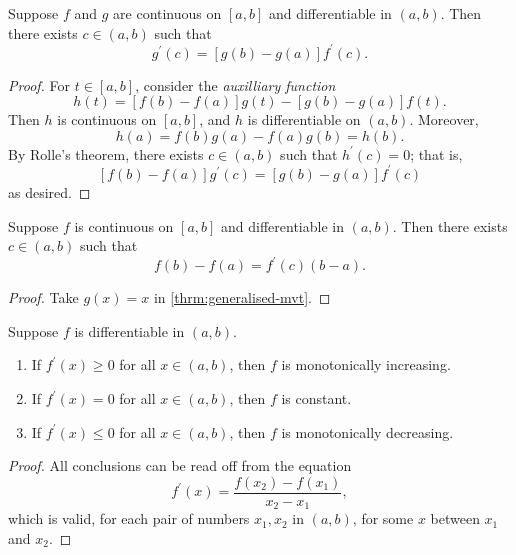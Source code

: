 \begin{theorem}\label{thrm:generalised-mvt}
Suppose $f$ and $g$ are continuous on $[a,b]$ and differentiable in $(a,b)$. Then there exists $c\in(a,b)$ such that
\begin{equation}
[f(b)-f(a)]g^\prime(c)=[g(b)-g(a)]f^\prime(c).
\end{equation}
\end{theorem}

\begin{proof}
For $t\in[a,b]$, consider the \emph{auxilliary function}
\[h(t)=[f(b)-f(a)]g(t)-[g(b)-g(a)]f(t).\]
Then $h$ is continuous on $[a,b]$, and $h$ is differentiable on $(a,b)$. Moreover,
\[h(a)=f(b)g(a)-f(a)g(b)=h(b).\]
By Rolle's theorem, there exists $c\in(a,b)$ such that $h^\prime(c)=0$; that is,
\[[f(b)-f(a)]g^\prime(c)=[g(b)-g(a)]f^\prime(c)\]
as desired.
\end{proof}

\begin{theorem}\label{thrm:mvt}
Suppose $f$ is continuous on $[a,b]$ and differentiable in $(a,b)$. Then there exists $c\in(a,b)$ such that
\begin{equation}
f(b)-f(a)=f^\prime(c)(b-a).
\end{equation}
\end{theorem}

\begin{proof}
Take $g(x)=x$ in \cref{thrm:generalised-mvt}.
\end{proof}

\begin{lemma}
Suppose $f$ is differentiable in $(a,b)$.
\begin{enumerate}[label=(\roman*)]
\item If $f^\prime(x)\ge0$ for all $x\in(a,b)$, then $f$ is monotonically increasing.
\item If $f^\prime(x)=0$ for all $x\in(a,b)$, then $f$ is constant.
\item If $f^\prime(x)\le0$ for all $x\in(a,b)$, then $f$ is monotonically decreasing.
\end{enumerate}
\end{lemma}

\begin{proof}
All conclusions can be read off from the equation
\[f^\prime(x)=\frac{f(x_2)-f(x_1)}{x_2-x_1},\]
which is valid, for each pair of numbers $x_1,x_2$ in $(a,b)$, for some $x$ between
$x_1$ and $x_2$.
\end{proof}
\pagebreak

